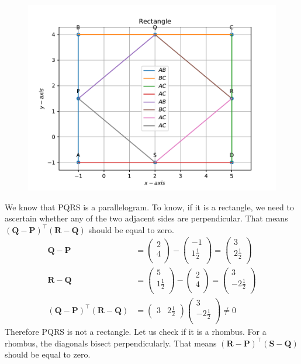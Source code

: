 \documentclass[12pt]{article}
\providecommand{\brak}[1]{\ensuremath{\left(#1\right)}}
\newcommand{\myvec}[1]{\ensuremath{\begin{pmatrix}#1\end{pmatrix}}}
\let\vec\mathbf
\begin{document}
\begin{enumerate}
\begin{figure}[!h]
	\begin{center}
		\includegraphics[width=\columnwidth]{./figs/problem1.pdf}
	\end{center}
\caption{}
\label{fig:Fig3}
\end{figure}
We know that PQRS is a parallelogram. To know, if it is a rectangle, we need to ascertain whether any of the two adjacent sides are perpendicular. 
That means $\brak{\vec{Q}-\vec{P}}^\top\brak{\vec{R}-\vec{Q}}$ should be equal to zero. \\
\begin{align}
\vec{Q}-\vec{P} &=  \myvec{
 2 \\
 4 \\
 } - \myvec{
 -1 \\
 1\frac{1}{2} \\
 } = \myvec{
 3 \\
 2\frac{1}{2} \\ 
 } \\
 \vec{R}-\vec{Q} &=  \myvec{
 5 \\
 1\frac{1}{2}\\
 } - \myvec{
 2 \\
 4 \\
 } = \myvec{
 3 \\
 -2\frac{1}{2} \\ 
 } \\ 
 \brak{\vec{Q}-\vec{P}}^\top\brak{\vec{R}-\vec{Q}} &= \myvec{
 3 & 2\frac{1}{2}} \myvec{
 3 \\
 -2\frac{1}{2} \\
 } \neq 0
\end{align}
Therefore PQRS is not a rectangle. Let us check if it is a rhombus. For a rhombus, the diagonals bisect perpendicularly. That means $\brak{\vec{R}-\vec{P}}^\top\brak{\vec{S}-\vec{Q}}$ should be equal to zero. \\



\end{enumerate}
\end{document}
